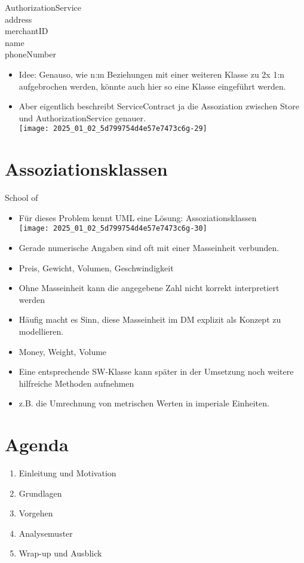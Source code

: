\documentclass[10pt]{article}
\begin{document}
AuthorizationService\\
address\\
merchantID\\
name\\
phoneNumber

\begin{itemize}
  \item Idee: Genauso, wie n:m Beziehungen mit einer weiteren Klasse zu 2x 1:n aufgebrochen werden, könnte auch hier so eine Klasse eingeführt werden.
  \item Aber eigentlich beschreibt ServiceContract ja die Assoziation zwischen Store und AuthorizationService genauer.\\
\texttt{[image: 2025\_01\_02\_5d799754d4e57e7473c6g-29]}
\end{itemize}

\section*{Assoziationsklassen}
School of

\begin{itemize}
  \item Für dieses Problem kennt UML eine Lösung: Assoziationsklassen\\
\texttt{[image: 2025\_01\_02\_5d799754d4e57e7473c6g-30]}
  \item Gerade numerische Angaben sind oft mit einer Masseinheit verbunden.
  \item Preis, Gewicht, Volumen, Geschwindigkeit
  \item Ohne Masseinheit kann die angegebene Zahl nicht korrekt interpretiert werden
  \item Häufig macht es Sinn, diese Masseinheit im DM explizit als Konzept zu modellieren.
  \item Money, Weight, Volume
  \item Eine entsprechende SW-Klasse kann später in der Umsetzung noch weitere hilfreiche Methoden aufnehmen
  \item z.B. die Umrechnung von metrischen Werten in imperiale Einheiten.
\end{itemize}

\section*{Agenda}
\begin{enumerate}
  \item Einleitung und Motivation
  \item Grundlagen
  \item Vorgehen
  \item Analysemuster
  \item Wrap-up und Ausblick
\end{enumerate}
\end{document}
